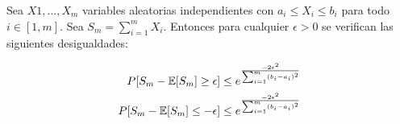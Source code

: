     \begin{teorema}
    Sea $X1,...,X_m$ variables aleatorias independientes con $a_i \leq X_i \leq b_i$ para todo $i \in [1,m]$. Sea $S_m = \sum_{i=1}^m X_i$. Entonces para cualquier $\epsilon > 0$ se verifican las siguientes desigualdades:
    
    \begin{equation}
        \begin{aligned}
            P[S_m - \mathbb{E}[S_m] \geq \epsilon] & \leq e^{\frac{-2\epsilon^2}{\sum_{i=1}^m (b_i-a_i)^2}} \\
            P[S_m - \mathbb{E}[S_m] \leq -\epsilon] & \leq e^{\frac{-2\epsilon^2}{\sum_{i=1}^m (b_i-a_i)^2}}
        \end{aligned}
    \end{equation}
    
    \end{teorema}
    
